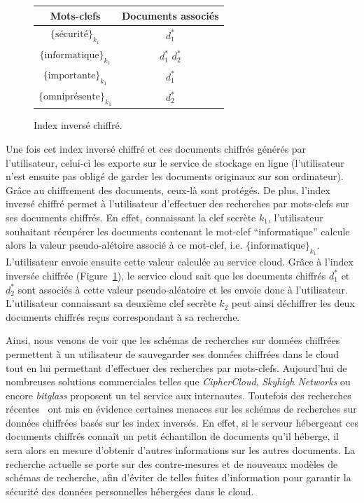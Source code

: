 \documentclass[french]{article}
\begin{document}
\begin{figure}[h]
  \centering
  \begin{tabular}{|c|c|}
    \hline
    Mots-clefs & Documents associés \\
    \hline
    $\{\textrm{s\'ecurit\'e}\}_{k_1}$ & $d_1^*$ \\
    \hline
    $\{\textrm{informatique}\}_{k_1}$ & $d_1^*$ $d_2^*$ \\
    \hline
    $\{\textrm{importante}\}_{k_1}$ & $d_1^*$ \\
    \hline
    $\{\textrm{omnipr\'esente}\}_{k_1}$ & $d_2^*$ \\
    \hline
  \end{tabular}
  \caption{Index inversé chiffré.}
  \label{fig:encindexinv}
\end{figure}

Une fois cet index inversé chiffré et ces documents chiffrés générés
par l'utilisateur, celui-ci les exporte sur le service de stockage en
ligne (l'utilisateur n'est ensuite pas obligé de garder les documents
originaux sur son ordinateur). Grâce au chiffrement des documents,
ceux-là sont protégés. De plus, l'index inversé chiffré permet à
l'utilisateur d'effectuer des recherches par mots-clefs sur ses
documents chiffrés. En effet, connaissant la clef secrète $k_1$,
l'utilisateur souhaitant récupérer les documents contenant le mot-clef
``informatique'' calcule alors la valeur pseudo-alétoire associé à ce
mot-clef, i.e. $\{\textrm{informatique}\}_{k_1}$. L'utilisateur envoie
ensuite cette valeur calculée au service cloud. Grâce à l'index
inversée chiffrée (Figure~\ref{fig:encindexinv}), le service cloud
sait que les documents chiffrés $d_1^*$ et $d_2^*$ sont associés à
cette valeur pseudo-aléatoire et les envoie donc à
l'utilisateur. L'utilisateur connaissant sa deuxième clef secrète
$k_2$ peut ainsi déchiffrer les deux documents chiffrés reçus
correspondant à sa recherche.

Ainsi, nous venons de voir que les schémas de recherches sur données
chiffrées permettent à un utilisateur de sauvegarder ses données
chiffrées dans le cloud tout en lui permettant d'effectuer des
recherches par mots-clefs. Aujourd'hui de nombreuses solutions
commerciales telles que \emph{CipherCloud}, \emph{Skyhigh Networks} ou
encore \emph{bitglass} proposent un tel service aux
internautes. Toutefois des recherches récentes~\cite{GiraudABL17} ont
mis en évidence certaines menaces sur les schémas de recherches sur
données chiffrées basés sur les index inversés. En effet, si le
serveur hébergeant ces documents chiffrés connaît un petit échantillon
de documents qu'il héberge, il sera alors en mesure d'obtenir d'autres
informations sur les autres documents. La recherche actuelle se porte
sur des contre-mesures et de nouveaux modèles de schémas de recherche,
afin d'éviter de telles fuites d'information pour garantir la sécurité
des données personnelles hébergées dans le cloud.

{}

\end{document}
